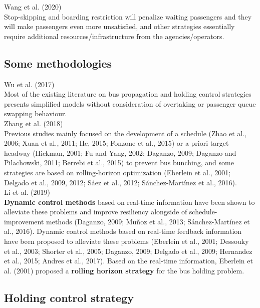 \documentclass{article}
\begin{document}
\noindent \textrm{Wang et al. (2020)}\\
Stop-skipping and boarding restriction will penalize waiting passengers 
and they will make passengers even more unsatisfied, 
and other strategies essentially require additional resources/infrastructure 
from the agencies/operators. \\

\subsection*{Some methodologies}
\noindent \textrm{Wu et al. (2017)}\\
Most of the existing literature on bus propagation and holding control strategies 
presents simplified models 
without consideration of overtaking or passenger queue swapping behaviour.\\

\noindent \textrm{Zhang et al. (2018)}\\
Previous studies mainly focused on the development of a schedule 
\textrm{(Zhao et al., 2006; Xuan et al., 2011; He, 2015; Fonzone et al., 2015)} 
or a priori target headway 
\textrm{(Hickman, 2001; Fu and Yang, 2002; Daganzo, 2009; Daganzo and Pilachowski, 2011; Berrebi et al., 2015)}
to prevent bus bunching, 
and some strategies are based on rolling-horizon optimization
\textrm{(Eberlein et al., 2001; Delgado et al., 2009, 2012; Sáez et al., 2012; Sánchez-Martínez et al., 2016)}.\\

\noindent \textrm{Li et al. (2019)}\\
\textbf{Dynamic control methods} based on real-time information have been shown 
to alleviate these problems and improve resiliency alongside of schedule-improvement methods 
\textrm{(Daganzo, 2009; Muñoz et al., 2013; Sánchez-Martínez et al., 2016)}.
Dynamic control methods based on real-time feedback information
 have been proposed to alleviate these problems 
\textrm{(Eberlein et al., 2001; Dessouky et al., 2003; Shorter et al., 2005; 
Daganzo, 2009; Delgado et al., 2009; Hernandez et al., 2015; Andres et al., 2017)}.
Based on the real-time information,
\textrm{Eberlein et al. (2001)} proposed a \textbf{rolling horizon strategy} for the bus holding problem.\\

\subsection*{Holding control strategy}
\end{document}
